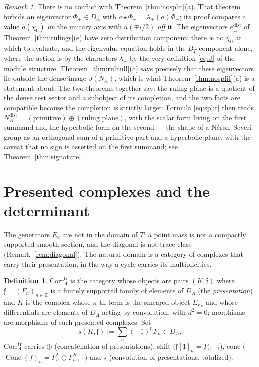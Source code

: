 \documentclass[11pt]{amsart}
\theoremstyle{definition}
\newtheorem{definition}[theorem]{Definition}
\theoremstyle{remark}
\newtheorem{remark}[theorem]{Remark}
\newcommand{\Z}{\mathbb Z}
\newcommand{\Cone}{\operatorname{Cone}}
\newcommand{\DA}{D_A}
\newcommand{\Corrtr}{\mathrm{Corr}^{\mathrm{tr}}_{A}}
\newcommand{\BT}{B_T}
\newcommand{\NAd}{N_A^{\mathrm{dist}}}
\begin{document}
\begin{remark}\label{rem:nocontradiction}
There is no conflict with Theorem~\ref{thm:nosplit}(a).  That theorem forbids
an eigenvector $\Phi_{\mp}\in\DA$ with $a\star\Phi_{\mp}=\lambda_{\mp}(a)
\Phi_{\mp}$; its proof compares a value $\widehat a(\chi_0)$ \emph{on} the
unitary axis with $\widehat a(\mp i/2)$ \emph{off} it.  The eigenvectors
$e_{\pm}^{\mathrm{dist}}$ of Theorem~\ref{thm:rulings}(e) have zero
distribution component: there is no $\chi_0$ at which to evaluate, and the
eigenvalue equation holds in the $\BT$-component alone, where the action is by
the characters $\lambda_{\mp}$ by the very definition \eqref{eq:J} of the
module structure.  Theorem~\ref{thm:rulnull}(c) says precisely that these
eigenvectors lie outside the dense image $J(N_A)$, which is what
Theorem~\ref{thm:nosplit}(a) is a statement about.  The two theorems together
say: the ruling plane is a quotient of the dense test sector and a subobject of
its completion, and the two facts are compatible because the completion is
strictly larger.  Formula \eqref{eq:split} then reads
$\NAd=(\text{primitive})\oplus(\text{ruling plane})$, with the scalar form
living on the first summand and the hyperbolic form on the second --- the
shape of a N\'eron--Severi group as an orthogonal sum of a primitive part and a
hyperbolic plane, with the caveat that no sign is asserted on the first
summand; see Theorem~\ref{thm:signature}.
\end{remark}

\section{Presented complexes and the determinant}\label{sec:presented}

The generators $E_a$ are not in the domain of $T$: a point mass is not a
compactly supported smooth section, and the diagonal is not trace class
(Remark~\ref{rem:diagonal}).  The natural domain is a category of complexes
that carry their presentation, in the way a cycle carries its
multiplicities.

\begin{definition}\label{def:Corrtr}
$\Corrtr$ is the category whose objects are pairs $(K,\mathfrak f)$ where
$\mathfrak f=(F_n)_{n\in\Z}$ is a finitely supported family of elements of
$\DA$ (the \emph{presentation}) and $K$ is the complex whose $n$-th term is the
smeared object $E_{F_n}$ and whose differentials are elements of $\DA$ acting
by convolution, with $d^{2}=0$; morphisms are morphisms of such presented
complexes.  Set
\begin{equation}\label{eq:s}
s(K,\mathfrak f):=\sum_n(-1)^{n}F_n\in\DA .
\end{equation}
$\Corrtr$ carries $\oplus$ (concatenation of presentations), shift
($\mathfrak f[1]_n=F_{n+1}$), cone
($\Cone(f)_n=F^{L}_n\oplus F^{K}_{n+1}$) and $\star$ (convolution of
presentations, totalized).
\end{definition}
\end{document}
